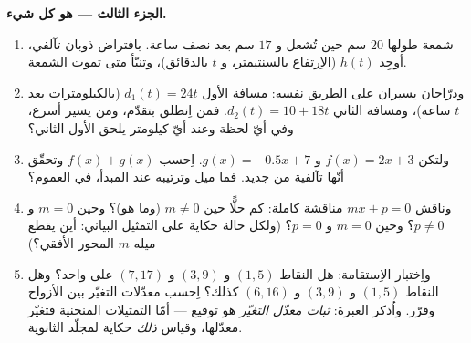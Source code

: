 \begin{problem}
\medskip
\noindent\textbf{الجزء الثالث ---  هو كل شيء.}
\begin{enumerate}[resume]
  \item شمعة طولها $20$ سم حين تُشعل و $17$ سم بعد نصف
        ساعة. بافتراض ذوبان تآلفي، أوجِد $h(t)$ (الاِرتفاع
        بالسنتيمتر، و $t$ بالدقائق)، وتنبّأ متى تموت الشمعة.
  \item ودرّاجان يسيران على الطريق نفسه: مسافة الأول
        $d_1(t) = 24t$ (بالكيلومترات بعد $t$ ساعة)، ومسافة
        الثاني $d_2(t) = 10 + 18t$. فمن اِنطلق بتقدّم، ومن يسير
        أسرع، وفي أيّ لحظة وعند أيّ كيلومتر يلحق الأول الثاني؟
  \item ولتكن $f(x) = 2x + 3$ و $g(x) = -0.5x + 7$. اِحسب
        $f(x) + g(x)$ وتحقّق أنّها تآلفية من جديد. فما
        ميل  وترتيبه عند المبدأ، في العموم؟
  \item وناقش  $mx + p = 0$ مناقشة كاملة: كم حلًّا حين
        $m \neq 0$ (وما هو)؟ وحين $m = 0$ و $p \neq 0$؟ وحين
        $m = 0$ و $p = 0$؟ (ولكل حالة حكاية على التمثيل
        البياني: أين يقطع  ميله $m$ المحور الأفقي؟)
  \item واِختبار الاِستقامة: هل النقاط $(1, 5)$ و $(3, 9)$
        و $(7, 17)$ على  واحد؟ وهل النقاط $(1, 5)$
        و $(3, 9)$ و $(6, 16)$ كذلك؟ اِحسب معدّلات التغيّر بين
        الأزواج وقرّر. واُذكر العبرة: \emph{ثبات معدّل التغيّر}
        هو توقيع  --- أمّا التمثيلات المنحنية
        فتغيّر معدّلها، وقياس \emph{ذلك} حكاية لمجلّد الثانوية.
\end{enumerate}
\end{problem}
